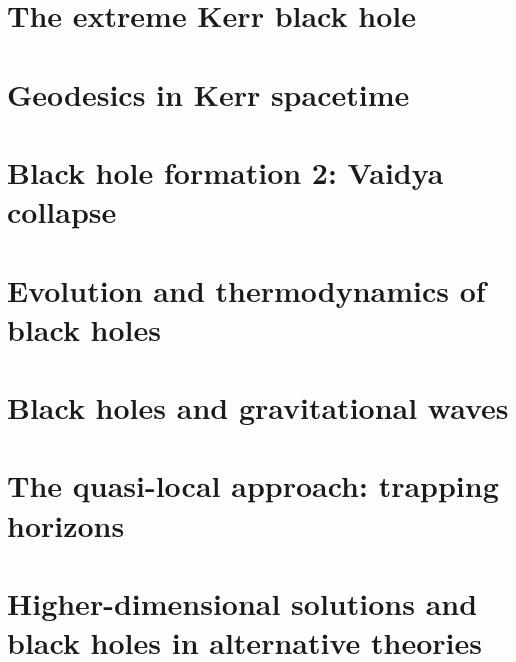 \documentclass[12pt,a4paper]{book}
\begin{document}
\chapter{The extreme Kerr black hole} \label{s:ext}

\chapter{Geodesics in Kerr spacetime} \label{s:gek}


\chapter{Black hole formation 2: Vaidya collapse} \label{s:vai}

\chapter{Evolution and thermodynamics of black holes}

\chapter{Black holes and gravitational waves}

\chapter{The quasi-local approach: trapping horizons} \label{s:loc}

\chapter{Higher-dimensional solutions and black holes in alternative theories} \label{s:hid}

\appendix







\printindex
\end{document}
